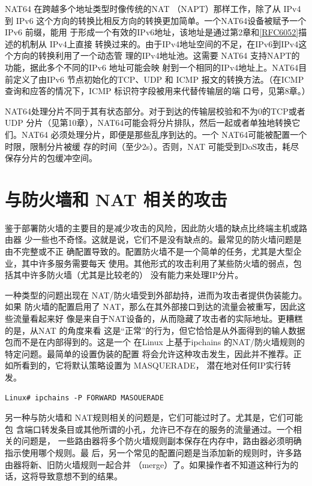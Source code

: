 NAT64 在跨越多个地址类型时像传统的NAT （NAPT）那样工作，除了从 IPv4到 IPv6
这个方向的转换比相反方向的转换更加简单。一个NAT64设备被赋予一个 IPv6 前缀，能用
于形成一个有效的IPv6地址，该地址是通过第2章和\href{https://www.rfc-editor.org/rfc/rfc6052}{[RFC6052]}描述的机制从
IPv4上直接
转换过来的。由于IPv4地址空间的不足，在IPv6到IPv4这个方向的转换利用了一个动态管
理的IPv4地址池。这需要 NAT64 支持NAPT的功能，据此多个不同的IPv6 地址可能会映
射到一个相同的IPv4地址上。NAT64目前定义了由IPv6 节点初始化的TCP、UDP 和 ICMP
报文的转换方法。（在ICMP 查询和应答的情况下，ICMP 标识符字段被用来代替传输层的端
口号，见第8章。）

NAT64处理分片不同于其有状态部分。对于到达的传输层校验和不为0的TCP或者
UDP 分片（见第10章），NAT64可能会将分片排队，然后一起或者单独地转换它们。NAT64
必须处理分片，即便是那些乱序到达的。一个 NAT64可能被配置一个时限，限制分片被缓
存的时间（至少2s）。否则，NAT 可能受到DoS攻击，耗尽保存分片的包缓冲空间。

\section{与防火墙和 NAT 相关的攻击}

鉴于部署防火墙的主要目的是减少攻击的风险，因此防火墙的缺点比终端主机或路由器
少一些也不奇怪。这就是说，它们不是没有缺点的。最常见的防火墙问题是由不完整或不正
确配置导致的。配置防火墙不是一个简单的任务，尤其是大型企业，其中许多服务需要每天
使用。其他形式的攻击利用了某些防火墙的弱点，包括其中许多防火墙（尤其是比较老的）
没有能力来处理IP分片。

一种类型的问题出现在 NAT/防火墙受到外部劫持，进而为攻击者提供伪装能力。如果
防火墙的配置启用了 NAT，那么在其外部接口到达的流量会被重写，因此这些流量看起来好
像是来自于NAT设备的，从而隐藏了攻击者的实际地址。更糟糕的是，从NAT 的角度来看
这是“正常”的行为，但它恰恰是从外面得到的输人数据包而不是在内部得到的。这是一个
在Linux 上基于ipchains 的NAT/防火墙规则的特定问题。最简单的设置伪装的配置
将会允许这种攻击发生，因此并不推荐。正如所看到的，它将默认策略设置为 MASQUERADE，
潜在地对任何IP实行转发。

\begin{verbatim}
Linux# ipchains -P FORWARD MASOUERADE
\end{verbatim}

另一种与防火墙和 NAT规则相关的问题是，它们可能过时了。尤其是，它们可能包
含端口转发条目或其他所谓的小孔，允许已不存在的服务的流量通过。一个相关的问题是，
一些路由器将多个防火墙规则副本保存在内存中，路由器必须明确指示使用哪个规则。最
后，另一个常见的配置问题是当添加新的规则时，许多路由器将新、旧防火墙规则一起合并
（merge）了。如果操作者不知道这种行为的话，这将导致意想不到的结果。

